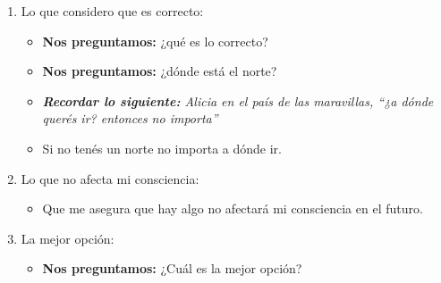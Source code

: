 \begin{enumerate}
    \item Lo que considero que es correcto: 
        \begin{itemize}
            \item \textbf{Nos preguntamos:} ¿qué es lo correcto?
            \item \textbf{Nos preguntamos:} ¿dónde está el norte?
            \item \emph{\textbf{Recordar lo siguiente: }Alicia en el país de las maravillas, ``¿a dónde querés ir? entonces no importa''}
            \item Si no tenés un norte no importa a dónde ir.
        \end{itemize}

    \item Lo que no afecta mi consciencia:
        \begin{itemize}
            \item Que me asegura que hay algo no afectará mi consciencia en el futuro.
        \end{itemize}

    \item La mejor opción:
        \begin{itemize}
            \item \textbf{Nos preguntamos:} ¿Cuál es la mejor opción?
        \end{itemize}
\end{enumerate}


